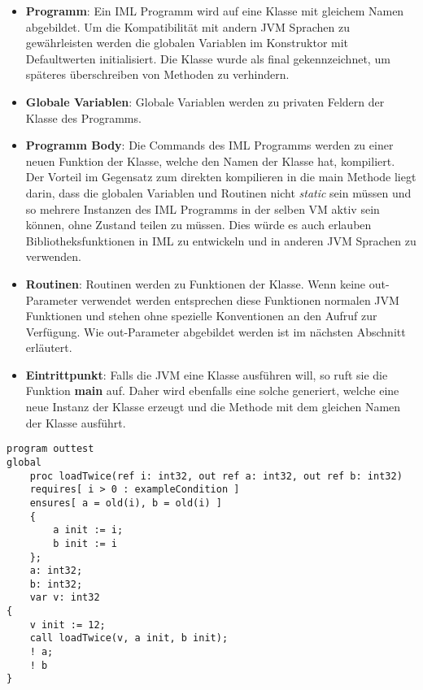 \begin{itemize}
    \item \textbf{Programm}: Ein IML Programm wird auf eine Klasse mit gleichem Namen abgebildet.
                            Um die Kompatibilität mit andern JVM Sprachen zu gewährleisten werden die globalen
                            Variablen im Konstruktor mit Defaultwerten initialisiert. Die Klasse wurde als final 
                            gekennzeichnet, um späteres überschreiben von Methoden zu verhindern.
    \item \textbf{Globale Variablen}: Globale Variablen werden zu privaten Feldern der Klasse des Programms.
    \item \textbf{Programm Body}: Die Commands des IML Programms werden zu einer neuen Funktion der Klasse,
                                 welche den Namen der Klasse hat, kompiliert. Der Vorteil im Gegensatz zum 
                                 direkten kompilieren in die main Methode liegt darin, dass die globalen Variablen 
                                 und Routinen nicht \textit{static} sein müssen und so mehrere Instanzen des 
                                 IML Programms in der selben VM aktiv sein können, ohne Zustand teilen zu müssen. 
                                 Dies würde es auch erlauben Bibliotheksfunktionen in IML zu entwickeln und 
                                 in anderen JVM Sprachen zu verwenden.
    \item \textbf{Routinen}: Routinen werden zu Funktionen der Klasse. Wenn keine out-Parameter verwendet
                             werden entsprechen diese Funktionen normalen JVM Funktionen und stehen ohne 
                             spezielle Konventionen an den Aufruf zur Verfügung. Wie out-Parameter abgebildet 
                             werden ist im nächsten Abschnitt erläutert.
    \item \textbf{Eintrittpunkt}: Falls die JVM eine Klasse ausführen will, so ruft sie die Funktion \textbf{main}
                                  auf. Daher wird ebenfalls eine solche generiert, welche eine neue Instanz der 
                                  Klasse erzeugt und die Methode mit dem gleichen Namen der Klasse ausführt.
\end{itemize}
\vspace{0.5cm}
\begin{lstlisting}[caption=Laden eines Int-Wertes in zwei Speicherstellen über out Parameter,label={lst:outtest}]
program outtest
global
    proc loadTwice(ref i: int32, out ref a: int32, out ref b: int32)
    requires[ i > 0 : exampleCondition ]
    ensures[ a = old(i), b = old(i) ]
    {
        a init := i;
        b init := i
    };
    a: int32;
    b: int32;
    var v: int32
{
    v init := 12;
    call loadTwice(v, a init, b init);
    ! a;
    ! b
}
\end{lstlisting}

